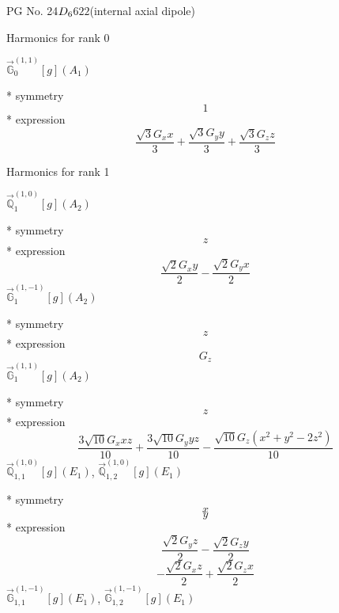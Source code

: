 \documentclass[fleqn,8pt]{jsarticle}
\begin{document}
\setcounter{MaxMatrixCols}{32}

\renewcommand{\tablename}{Table~}
\renewcommand{\figurename}{Figure~}
\begin{center}
\LARGE
PG No. 24\quad$D_{\rm 6}$\quad$622$\quad[ hexagonal ] (internal axial dipole)
\end{center}

\noindent * Harmonics for rank 0

\noindent\quad $\vec{\mathbb{G}}_{0}^{(1,1)}[g](A_{1})$

\noindent\quad ** symmetry
\begin{dmath*}
1
\end{dmath*}
\noindent\quad ** expression
\begin{dmath*}
\frac{\sqrt{3} G_{x} x}{3} + \frac{\sqrt{3} G_{y} y}{3} + \frac{\sqrt{3} G_{z} z}{3}
\end{dmath*}

\noindent * Harmonics for rank 1

\noindent\quad $\vec{\mathbb{Q}}_{1}^{(1,0)}[g](A_{2})$

\noindent\quad ** symmetry
\begin{dmath*}
z
\end{dmath*}
\noindent\quad ** expression
\begin{dmath*}
\frac{\sqrt{2} G_{x} y}{2} - \frac{\sqrt{2} G_{y} x}{2}
\end{dmath*}
\noindent\quad $\vec{\mathbb{G}}_{1}^{(1,-1)}[g](A_{2})$

\noindent\quad ** symmetry
\begin{dmath*}
z
\end{dmath*}
\noindent\quad ** expression
\begin{dmath*}
G_{z}
\end{dmath*}
\noindent\quad $\vec{\mathbb{G}}_{1}^{(1,1)}[g](A_{2})$

\noindent\quad ** symmetry
\begin{dmath*}
z
\end{dmath*}
\noindent\quad ** expression
\begin{dmath*}
\frac{3 \sqrt{10} G_{x} x z}{10} + \frac{3 \sqrt{10} G_{y} y z}{10} - \frac{\sqrt{10} G_{z} \left(x^{2} + y^{2} - 2 z^{2}\right)}{10}
\end{dmath*}
\noindent\quad $\vec{\mathbb{Q}}_{1,1}^{(1,0)}[g](E_{1})$, $\vec{\mathbb{Q}}_{1,2}^{(1,0)}[g](E_{1})$

\noindent\quad ** symmetry
\begin{dmath*}
x
\end{dmath*}
\begin{dmath*}
y
\end{dmath*}
\noindent\quad ** expression
\begin{dmath*}
\frac{\sqrt{2} G_{y} z}{2} - \frac{\sqrt{2} G_{z} y}{2}
\end{dmath*}
\begin{dmath*}
- \frac{\sqrt{2} G_{x} z}{2} + \frac{\sqrt{2} G_{z} x}{2}
\end{dmath*}
\noindent\quad $\vec{\mathbb{G}}_{1,1}^{(1,-1)}[g](E_{1})$, $\vec{\mathbb{G}}_{1,2}^{(1,-1)}[g](E_{1})$
\end{document}
